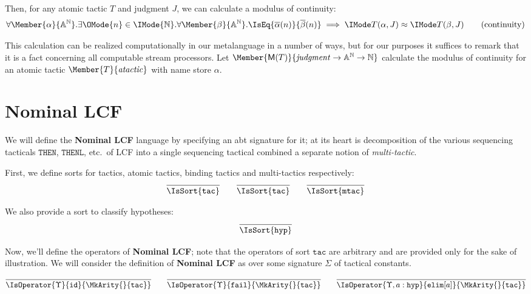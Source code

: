 Then, for any atomic tactic $T$ and judgment $J$, we can calculate a
modulus of continuity:
\begin{equation}
  \forall \Member{\alpha}{\MLStream{\MLAtom}}.
  \exists \OMode{n}\in\IMode{\MLNat}.
  \forall \Member{\beta}{\MLStream{\MLAtom}}.
    \IsEq{\bar{\alpha}(n)}{\bar{\beta}(n)}\implies \KleeneEq{T(\alpha,J)}{T(\beta,J)}
  \tag{continuity}
\end{equation}

This calculation can be realized computationally in our metalanguage in a
number of ways, but for our purposes it suffices to remark that it is a fact
concerning all computable stream processors. Let
$\Member{\ModC{T}}{\LCFJudgment\to\MLStream{\MLAtom}\to\MLNat}$ calculate the modulus of continuity
for an atomic tactic $\Member{T}{\LCFAtomicTactic}$ with name store $\alpha$.

\section{Nominal LCF}

\newcommand\SortTac{\mathtt{tac}}
\newcommand\SortMTac{\mathtt{mtac}}
\newcommand\SortHyp{\mathtt{hyp}}

We will define the \textbf{Nominal LCF} language by specifying an abt signature
for it; at its heart is decomposition of the various sequencing tacticals
$\mathtt{THEN}$, $\mathtt{THENL}$, etc.\ of LCF into a single sequencing
tactical combined a separate notion of \emph{multi-tactic}.

First, we define sorts for tactics, atomic tactics, binding tactics and multi-tactics
respectively:
\begin{gather*}
  \infer{
    \IsSort{\SortTac}
  }{}
  \qquad
  \infer{
    \IsSort{\SortTac}
  }{}
  \qquad
  \infer{
    \IsSort{\SortMTac}
  }{}
\end{gather*}

We also provide a sort to classify hypotheses:
\[
  \infer{
    \IsSort{\SortHyp}
  }{
  }
\]

Now, we'll define the operators of \textbf{Nominal LCF}; note that the
operators of sort $\SortTac$ are arbitrary and are provided only for the sake
of illustration. We will consider the definition of \textbf{Nominal LCF} as
over some signature $\Sigma$ of tactical constants.

\[
  \infer{
    \IsOperator{\Upsilon}{\mathtt{id}}{
      \MkArity{}{\SortTac}
    }
  }{
  }
  \qquad
  \infer{
    \IsOperator{\Upsilon}{\mathtt{fail}}{
      \MkArity{}{\SortTac}
    }
  }{
  }
  \qquad
  \infer{
    \IsOperator{\Upsilon,a:\SortHyp}{\mathtt{elim}[a]}{
      \MkArity{}{\SortTac}
    }
  }{
  }
\]

